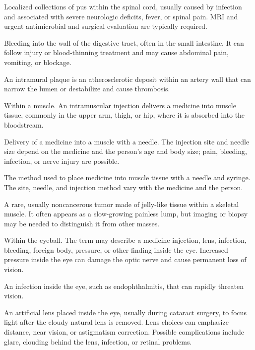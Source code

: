  Localized collections of pus within the spinal cord, usually caused by infection and associated with severe neurologic deficits, fever, or spinal pain. MRI and urgent antimicrobial and surgical evaluation are typically required.

 Bleeding into the wall of the digestive tract, often in the small intestine. It can follow injury or blood-thinning treatment and may cause abdominal pain, vomiting, or blockage.

 An intramural plaque is an atherosclerotic deposit within an artery wall that can narrow the lumen or destabilize and cause thrombosis.

 Within a muscle. An intramuscular injection delivers a medicine into muscle tissue, commonly in the upper arm, thigh, or hip, where it is absorbed into the bloodstream.

 Delivery of a medicine into a muscle with a needle. The injection site and needle size depend on the medicine and the person’s age and body size; pain, bleeding, infection, or nerve injury are possible.

 The method used to place medicine into muscle tissue with a needle and syringe. The site, needle, and injection method vary with the medicine and the person.

 A rare, usually noncancerous tumor made of jelly-like tissue within a skeletal muscle. It often appears as a slow-growing painless lump, but imaging or biopsy may be needed to distinguish it from other masses.

 Within the eyeball. The term may describe a medicine injection, lens, infection, bleeding, foreign body, pressure, or other finding inside the eye. Increased pressure inside the eye can damage the optic nerve and cause permanent loss of vision.

 An infection inside the eye, such as endophthalmitis, that can rapidly threaten vision.

 An artificial lens placed inside the eye, usually during cataract surgery, to focus light after the cloudy natural lens is removed. Lens choices can emphasize distance, near vision, or astigmatism correction. Possible complications include glare, clouding behind the lens, infection, or retinal problems.

